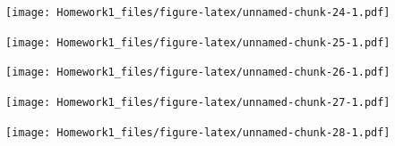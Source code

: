 \documentclass[]{article}
\newenvironment{Shaded}{\begin{snugshade}}{\end{snugshade}}
\newcommand{\KeywordTok}[1]{\textcolor[rgb]{0.13,0.29,0.53}{\textbf{#1}}}
\newcommand{\OperatorTok}[1]{\textcolor[rgb]{0.81,0.36,0.00}{\textbf{#1}}}
\newcommand{\NormalTok}[1]{#1}
\begin{document}
\begin{Shaded}
\end{Shaded}

\texttt{[image: Homework1\_files/figure-latex/unnamed-chunk-24-1.pdf]}

\begin{Shaded}
\end{Shaded}

\texttt{[image: Homework1\_files/figure-latex/unnamed-chunk-25-1.pdf]}

\begin{Shaded}
\end{Shaded}

\texttt{[image: Homework1\_files/figure-latex/unnamed-chunk-26-1.pdf]}

\begin{Shaded}
\end{Shaded}

\texttt{[image: Homework1\_files/figure-latex/unnamed-chunk-27-1.pdf]}

\begin{Shaded}
\end{Shaded}

\texttt{[image: Homework1\_files/figure-latex/unnamed-chunk-28-1.pdf]}

\begin{Shaded}
\end{Shaded}
\end{document}
